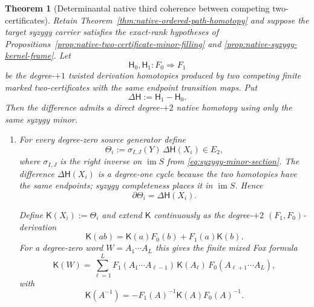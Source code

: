 \documentclass[11pt]{article}
\newtheorem{theorem}{Theorem}[section]
\theoremstyle{definition}
\begin{document}
\begin{theorem}[Determinantal native third coherence between competing two-certificates]\label{thm:native-ordered-third-coherence}
Retain Theorem~\ref{thm:native-ordered-path-homotopy} and suppose the target
syzygy carrier satisfies the exact-rank hypotheses of
Propositions~\ref{prop:native-two-certificate-minor-filling} and
\ref{prop:native-syzygy-kernel-frame}.  Let
\[
 \mathsf H_0,\mathsf H_1:F_0\Rightarrow F_1
\]
be the degree-$+1$ twisted derivation homotopies produced by two competing
finite marked two-certificates with the same endpoint transition maps.  Put
\[
 \Delta\mathsf H:=\mathsf H_1-\mathsf H_0.
\]
Then the difference admits a direct degree-$+2$ native homotopy using only the
same syzygy minor.

\begin{enumerate}[label=\textnormal{(\roman*)}]
\item For every degree-zero source generator define
\begin{equation}\label{eq:native-third-generator-filling}
 \Theta_i
 :=\sigma_{I,J}(Y)\,\Delta\mathsf H(X_i)\in E_2,
\end{equation}
where $\sigma_{I,J}$ is the right inverse on $\operatorname{im}S$ from
\eqref{eq:syzygy-minor-section}.  The difference
$\Delta\mathsf H(X_i)$ is a degree-one cycle because the two homotopies have
the same endpoints; syzygy completeness places it in $\operatorname{im}S$.
Hence
\begin{equation}\label{eq:native-third-generator-boundary}
 \partial\Theta_i=\Delta\mathsf H(X_i).
\end{equation}

Define $\mathsf K(X_i):=\Theta_i$ and extend $\mathsf K$ continuously as the
degree-$+2$ $(F_1,F_0)$-derivation
\begin{equation}\label{eq:degree-two-twisted-derivation}
 \mathsf K(ab)
 =\mathsf K(a)F_0(b)+F_1(a)\mathsf K(b).
\end{equation}
For a degree-zero word $W=A_1\cdots A_L$ this gives the finite mixed Fox
formula
\begin{equation}\label{eq:degree-two-mixed-fox-word}
 \mathsf K(W)
 =\sum_{\ell=1}^{L}
 F_1(A_1\cdots A_{\ell-1})\,
 \mathsf K(A_\ell)\,
 F_0(A_{\ell+1}\cdots A_L),
\end{equation}
with
\[
 \mathsf K(A^{-1})
 =-F_1(A)^{-1}\mathsf K(A)F_0(A)^{-1}.
\]


\end{enumerate}
\end{theorem}
\end{document}
